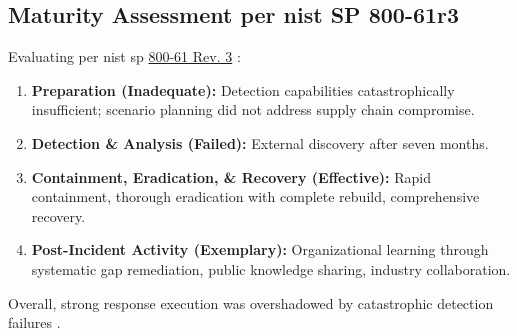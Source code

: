 \subsection{Maturity Assessment per \gls{nist} SP 800-61r3}
Evaluating per \gls{nist} \gls{sp} \href{https://csrc.nist.gov/pubs/sp/800/61/r3/final}{800-61 Rev. 3} \cite{nelson_incident_2025}:
\begin{enumerate}
    \item \textbf{Preparation (Inadequate):} Detection capabilities catastrophically insufficient; scenario planning did not address supply chain compromise.
    \item \textbf{Detection \& Analysis (Failed):} External discovery after seven months.
    \item \textbf{Containment, Eradication, \& Recovery (Effective):} Rapid containment, thorough eradication with complete rebuild, comprehensive recovery.
    \item \textbf{Post-Incident Activity (Exemplary):} Organizational learning through systematic gap remediation, public knowledge sharing, industry collaboration.
\end{enumerate}
Overall, strong response execution was overshadowed by catastrophic detection failures \cite{rose_zero_2020}.
